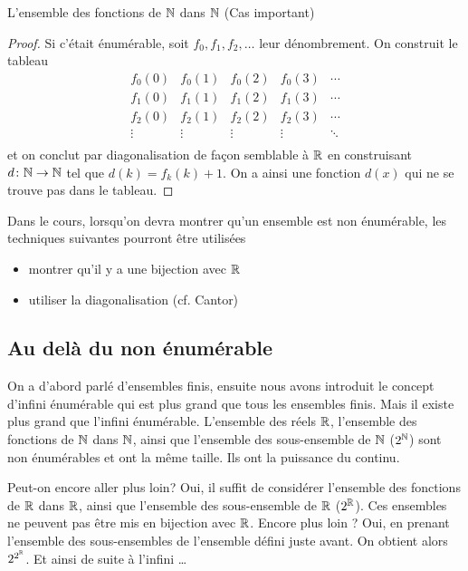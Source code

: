 \begin{myexem}
  \label{exem:fNN}
 L'ensemble des fonctions de $\mathbb{N}$ dans $\mathbb{N}$ (Cas important)
 \begin{proof}
   Si c'était énumérable, soit $f_0, f_1, f_2, \ldots$ leur dénombrement.
   On construit le tableau
   \[
     \begin{array}{ccccc}
       f_0(0) & f_0(1) & f_0(2) & f_0(3) & \cdots\\
       f_1(0) & f_1(1) & f_1(2) & f_1(3) & \cdots\\
       f_2(0) & f_2(1) & f_2(2) & f_2(3) & \cdots\\
       \vdots & \vdots & \vdots & \vdots & \ddots\\
     \end{array}
   \]
   et on conclut par diagonalisation de façon semblable à $\mathbb{R}$
   en construisant $d\colon \mathbb{N} \to \mathbb{N}$ tel que $d(k) = f_k(k)+1$.
   On a ainsi une fonction $d(x)$ qui ne se trouve pas dans le tableau.
 \end{proof}
\end{myexem}

Dans le cours, lorsqu'on devra montrer qu'un ensemble est non énumérable,
les techniques suivantes pourront être utilisées
\begin{itemize}
	\item montrer qu'il y a une bijection avec  $\mathbb{R}$
	\item utiliser la diagonalisation (cf. Cantor)
\end{itemize}


\subsection{Au delà du non énumérable}
\label{subsec:au_dela_du_non_enumerable}
On a d'abord parlé d'ensembles finis, ensuite nous avons introduit le concept d'infini 
énumérable qui est plus grand que tous les ensembles finis. Mais il existe plus grand 
que l'infini énumérable.   L'ensemble des réels $\mathbb{R}$, l'ensemble des fonctions de $\mathbb{N}$ dans $\mathbb{N}$, ainsi que 
l'ensemble des sous-ensemble de $\mathbb{N}$ ($2^{\mathbb{N}}$) sont non énumérables et ont la même taille.  Ils ont la puissance du continu. 

Peut-on encore aller plus loin?  Oui,  il suffit de considérer  l'ensemble des fonctions de $\mathbb{R}$ dans $\mathbb{R}$, ainsi que 
l'ensemble des sous-ensemble de $\mathbb{R}$ ($2^{\mathbb{R}}$).  Ces ensembles ne peuvent pas être mis en bijection avec $\mathbb{R}$.
Encore plus loin ?  Oui, en prenant l'ensemble des sous-ensembles de l'ensemble défini juste avant.  On obtient alors $2^{2^{\mathbb{R}}}$.  Et ainsi de suite à l'infini \ldots


